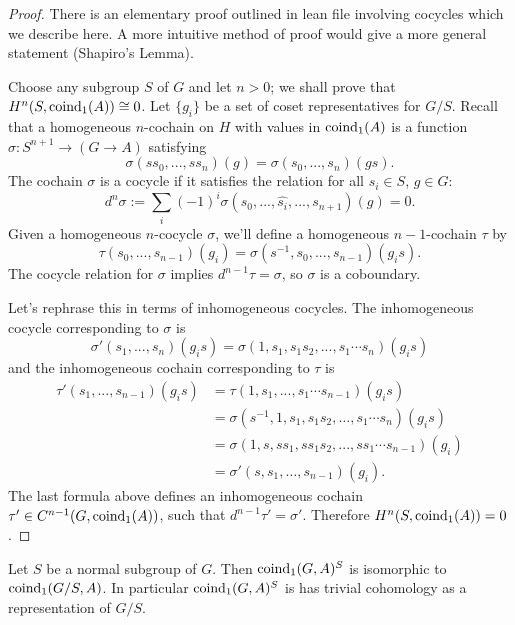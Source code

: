 \begin{proof}
  There is an elementary proof outlined in lean file involving cocycles which we describe here.
	A more intuitive method of proof would give a more general statement (Shapiro's Lemma).

  Choose any subgroup $S$ of $G$ and let $n > 0$; we shall prove that $H^n(S,\mathrm{coind}_1(A))\cong 0$.
	Let $\{g_i\}$ be a set of coset representatives for $G/S$.
  Recall that a homogeneous $n$-cochain on $H$ with values in $\mathrm{coind}_1(A)$
  is a function $\sigma : S^{n+1} \to (G \to A)$ satisfying
	\[
		\sigma (ss_0, ... , ss_n) (g) = \sigma (s_0,...,s_n) (gs).
	\]
  The cochain $\sigma$ is a cocycle if it satisfies the relation for all $s_i \in S$, $g \in G$:
	\[
		d^n \sigma := \sum_i (-1)^i  \sigma (s_0, ... ,\hat{s_i}, ... , s_{n+1}) (g) = 0.
	\]
  Given a homogeneous $n$-cocycle $\sigma$, we'll define a homogeneous $n-1$-cochain $\tau$ by
	\[
    \tau (s_0,...,s_{n-1}) (g_i) = \sigma (s^{-1},s_0,...,s_{n-1}) (g_i s).
	\]
  The cocycle relation for $\sigma$ implies $d^{n-1} \tau = \sigma$, so $\sigma$ is a coboundary.

  Let's rephrase this in terms of inhomogeneous cocycles.
	The inhomogeneous cocycle corresponding to $\sigma$ is
	\[
    \sigma' (s_1,...,s_n) (g_i s) = \sigma (1,s_1,s_1 s_2,..., s_1 \cdots s_n) (g_i s)
	\]
  and the inhomogeneous cochain corresponding to $\tau$ is
	\begin{align*}
		\tau' (s_1,...,s_{n-1}) (g_i s)
		&= \tau (1,s_1,... , s_1 \cdots s_{n-1}) (g_i s)\\
    &= \sigma (s^{-1}, 1, s_1, s_1 s_2,\ldots , s_1 \cdots s_n) (g_i s)\\
    &= \sigma (1, s, s s_1, s s_1 s_2, ..., s s_1 \cdots s_{n-1}) (g_i)\\
    &= \sigma' (s,s_1,\ldots,s_{n-1}) (g_i).
	\end{align*}
  The last formula above defines an inhomogeneous cochain $\tau' \in C^{n-1}(G,\mathrm{coind}_1(A))$,
	such that $d^{n-1} \tau' = \sigma'$.
	Therefore $H^n(S,\mathrm{coind}_1(A)) = 0$.
\end{proof}

\begin{lemma}	\label{lem:coind₁ invariants}
	\leanok
	Let $S$ be a normal subgroup of $G$. Then $\mathrm{coind}_1(G,A)^S$ is isomorphic to $\mathrm{coind}_1(G/S,A)$.
	In particular $\mathrm{coind}_1(G,A)^S$ is has trivial cohomology as a representation of $G/S$.
\end{lemma}

